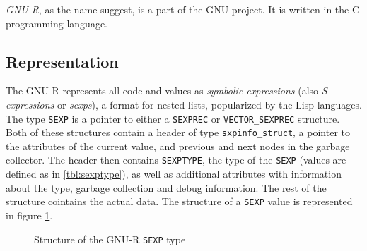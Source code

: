 \textit{GNU-R}, as the name suggest, is a part of the GNU project. It is written in the C programming language. 


\subsection*{Representation}

The GNU-R represents all code and values as \textit{symbolic expressions} (also \textit{S-expressions} or \textit{sexps}), a format for nested lists, popularized by the Lisp languages. The type \texttt{SEXP} is a pointer to either a \texttt{SEXPREC} or \texttt{VECTOR\_SEXPREC} structure. Both of these structures contain a header of type \texttt{sxpinfo\_struct}, a pointer to the attributes of the current value, and previous and next nodes in the garbage collector. The header then contains \texttt{SEXPTYPE}, the type of the \texttt{SEXP} (values are defined as in \ref{tbl:sexptype}), as well as additional attributes with information about the type, garbage collection and debug information. The rest of the structure cointains the actual data. The structure of a \texttt{SEXP} value is represented in figure \ref{fig:sexp-struct}.

\begin{figure}
	\centering
	\begin{adjustbox}{trim=5pt 20pt 0 40pt, clip}
	\end{adjustbox}
	\caption{Structure of the GNU-R \texttt{SEXP} type}\label{fig:sexp-struct}
\end{figure}

